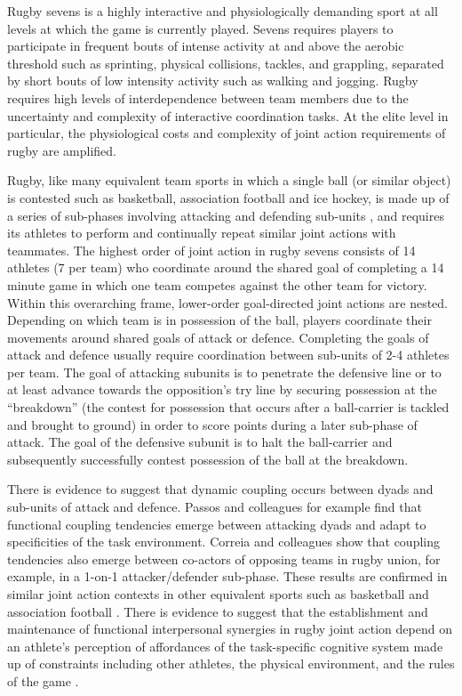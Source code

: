  Rugby sevens is a highly interactive and physiologically demanding sport at all levels at which the game is currently played. Sevens requires players to participate in frequent bouts of intense activity at and above the aerobic threshold such as sprinting, physical collisions, tackles, and grappling, separated by short bouts of low intensity activity such as walking and jogging. Rugby requires high levels of interdependence between team members due to the uncertainty and complexity of interactive coordination tasks.  At the elite level in particular, the physiological costs and complexity of joint action requirements of rugby are amplified.




Rugby, like many equivalent team sports in which a single ball (or similar object) is contested such as basketball, association football and ice hockey, is made up of a series of sub-phases involving attacking and defending sub-units \citep{Passos2011}, and requires its athletes to perform and continually repeat similar joint actions with teammates.   The highest order of joint action in rugby sevens consists of 14 athletes (7 per team) who coordinate around the shared goal of completing a 14 minute game in which one team competes against the other team for victory.  Within this overarching frame, lower-order goal-directed joint actions are nested.  Depending on which team is in possession of the ball, players coordinate their movements around shared goals of attack or defence.  Completing the goals of attack and defence usually require coordination between sub-units of 2-4 athletes per team.  The goal of attacking subunits is to penetrate the defensive line or to at least advance towards the opposition's try line by securing possession at the ``breakdown'' (the contest for possession that occurs after a ball-carrier is tackled and brought to ground) in order to score points during a later sub-phase of attack.  The goal of the defensive subunit is to halt the ball-carrier and subsequently successfully contest possession of the ball at the breakdown.

There is evidence to suggest that dynamic coupling occurs between dyads and sub-units of attack and defence\citep{Passos2011,Correia2014}.  Passos and colleagues \textcite{Passos2011} for example find that functional coupling tendencies emerge between attacking dyads and adapt to specificities of the task environment.  Correia and colleagues \textcite{Correia2014} show that coupling tendencies also emerge between co-actors of opposing teams in rugby union, for example, in a 1-on-1 attacker/defender sub-phase.  These results are confirmed in similar joint action contexts in other equivalent sports such as basketball and association football \citep{Duarte2013}. There is evidence to suggest that the establishment and maintenance of functional  interpersonal synergies in rugby joint action depend on an athlete's perception of affordances of the task-specific cognitive system made up of constraints including other athletes, the physical environment, and the rules of the game \citep{Passos2012}.

